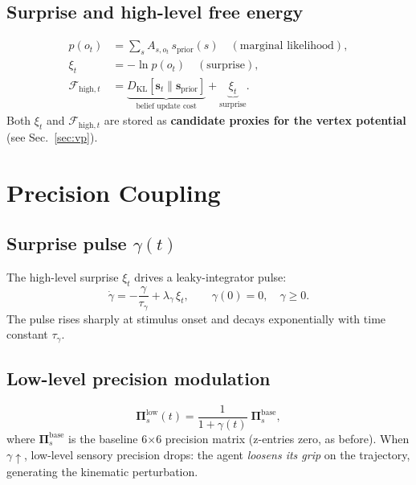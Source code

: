 \documentclass[11pt, a4paper]{article}
\newcommand{\vect}[1]{\bm{#1}}
\newcommand{\mat}[1]{\mathbf{#1}}
\newcommand{\FE}{\mathcal{F}}
\newcommand{\Pisl}{\mat{\Pi}_s^{\text{low}}}
\begin{document}
\subsection{Surprise and high-level free energy}
\begin{align}
  p(o_t) &= \sum_s A_{s,o_t}\,s_{\text{prior}}(s) \quad
            (\text{marginal likelihood}),\\[4pt]
  \xi_t   &= -\ln p(o_t) \quad (\text{surprise}),\\[4pt]
  \FE_{\text{high},t}
          &= \underbrace{D_{\mathrm{KL}}[\vect{s}_t \| \vect{s}_{\text{prior}}]}_{\text{belief update cost}}
           + \underbrace{\xi_t}_{\text{surprise}}.
  \label{eq:fe_high}
\end{align}
Both $\xi_t$ and $\FE_{\text{high},t}$ are stored as
\textbf{candidate proxies for the vertex potential}
(see Sec.~\ref{sec:vp}).

\section{Precision Coupling}
\label{sec:coupling}

\subsection{Surprise pulse $\gamma(t)$}
The high-level surprise $\xi_t$ drives a leaky-integrator pulse:
\begin{equation}
  \dot{\gamma} = -\frac{\gamma}{\tau_\gamma} + \lambda_\gamma\,\xi_t,
  \qquad \gamma(0) = 0, \quad \gamma \geq 0.
  \label{eq:gamma}
\end{equation}
The pulse rises sharply at stimulus onset and decays exponentially
with time constant $\tau_\gamma$.

\subsection{Low-level precision modulation}
\begin{equation}
  \boxed{
  \Pisl(t) = \frac{1}{1+\gamma(t)}\;\mat{\Pi}_s^{\text{base}},
  }
  \label{eq:pisl}
\end{equation}
where $\mat{\Pi}_s^{\text{base}}$ is the baseline 6$\times$6 precision matrix
(z-entries zero, as before). When $\gamma \uparrow$, low-level sensory
precision drops: the agent \emph{loosens its grip} on the trajectory,
generating the kinematic perturbation.
\end{document}
